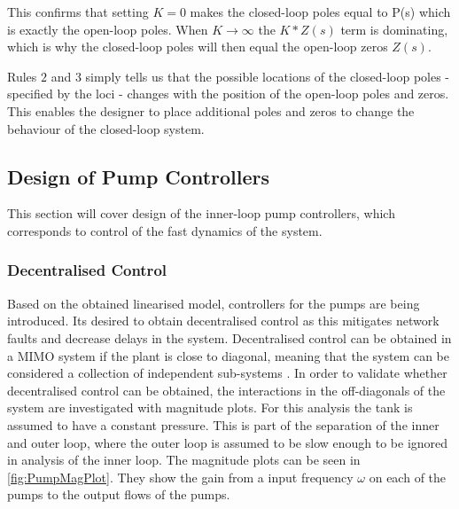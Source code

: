 This confirms that setting $ K=0 $ makes the closed-loop poles equal to P(s) which is exactly the open-loop poles. When $K \to \infty$ the $ K*Z(s) $ term is dominating, which is why the closed-loop poles will then equal the open-loop zeros $ Z(s) $.

Rules $2$ and $3$ simply tells us that the possible locations of the closed-loop poles - specified by the loci - changes with the position of the open-loop poles and zeros. This enables the designer to place additional poles and zeros to change the behaviour of the closed-loop system. 


\subsection{Design of Pump Controllers}
This section will cover design of the inner-loop pump controllers, which corresponds to control of the fast dynamics of the system.

\subsubsection{Decentralised Control}
Based on the obtained linearised model, controllers for the pumps are being introduced. Its desired to obtain decentralised control as this mitigates network faults and decrease delays in the system. Decentralised control can be obtained in a MIMO system if the plant is close to diagonal, meaning that the system can be considered a collection of independent sub-systems \cite[p. 91]{Skogestad2005}. 
In order to validate whether decentralised control can be obtained, the interactions in the off-diagonals of the system are investigated with magnitude plots. For this analysis the tank is assumed to have a constant pressure. This is part of the separation of the inner and outer loop, where the outer loop is assumed to be slow enough to be ignored in analysis of the inner loop. The magnitude plots can be seen in \cref{fig:PumpMagPlot}. They show the gain from a input frequency $\omega$ on each of the pumps to the output flows of the pumps.

